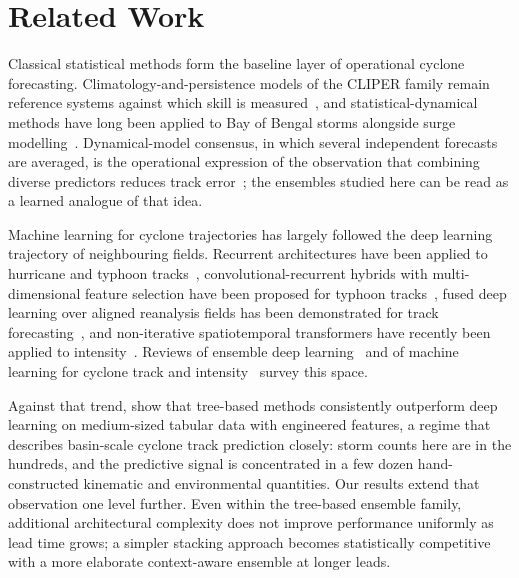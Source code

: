 \documentclass{ametsocv6.1}
\newcommand{\bob}{Bay of Bengal}
\begin{document}
\section{Related Work}
\label{sec:related}
Classical statistical methods form the baseline layer of operational cyclone
forecasting. Climatology-and-persistence models of the CLIPER family remain
reference systems against which skill is
measured~\citep{neumann1972alternative,aberson1998five}, and statistical-dynamical
methods have long been applied to \bob{} storms alongside surge
modelling~\citep{dube2009storm}. Dynamical-model consensus, in which several
independent forecasts are averaged, is the operational expression of the
observation that combining diverse predictors reduces track
error~\citep{goerss2000tropical,goerss2004tropical}; the ensembles studied here
can be read as a learned analogue of that idea.

Machine learning for cyclone trajectories has largely followed the deep learning
trajectory of neighbouring fields. Recurrent architectures have been applied to
hurricane and typhoon tracks~\citep{alemany2019predicting,rahman2025tropical},
convolutional-recurrent hybrids with multi-dimensional feature selection have
been proposed for typhoon tracks~\citep{lian2020novel}, fused deep learning over
aligned reanalysis fields has been demonstrated for track
forecasting~\citep{giffard2020tropical}, and non-iterative spatiotemporal
transformers have recently been applied to intensity~\citep{qu2025accurate}.
Reviews of ensemble deep learning~\citep{ganaie2022ensemble} and of machine
learning for cyclone track and intensity~\citep{kumar2024machine} survey this
space.

Against that trend, \citet{grinsztajn2022tree} show that
tree-based methods consistently outperform deep learning on medium-sized tabular
data with engineered features, a regime that describes basin-scale cyclone track
prediction closely: storm counts here are in the hundreds, and the predictive
signal is concentrated in a few dozen hand-constructed kinematic and
environmental quantities. Our results extend that observation one level further.
Even within the tree-based ensemble family, additional architectural complexity
does not improve performance uniformly as lead time grows; a simpler stacking
approach becomes statistically competitive with a more elaborate context-aware
ensemble at longer leads.
\end{document}
